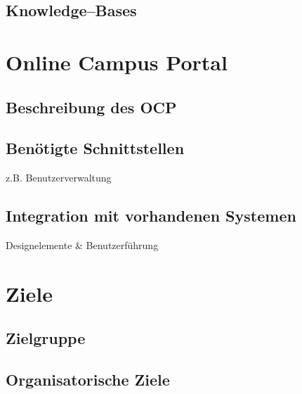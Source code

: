 
\subsection{Knowledge--Bases} %
\label{sub:knowledge_bases}


\section{Online Campus Portal} %
\label{sec:online_campus_portal}

\subsection{Beschreibung des OCP} %
\label{sub:beschreibung_des_ocp}


\subsection{Benötigte Schnittstellen} %
\label{sub:benotigte_schnittstellen}
z.B. Benutzerverwaltung

\subsection{Integration mit vorhandenen Systemen} %
\label{sub:integration_mit_vorhandenen_systemen}
Designelemente \& Benutzerführung


\section{Ziele} %
\label{sec:ziele}

\subsection{Zielgruppe} %
\label{sub:zielgruppe}


\subsection{Organisatorische Ziele} %
\label{sub:organisatorische_ziele}

